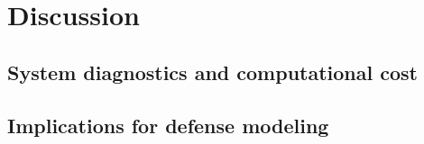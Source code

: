 
\section{Discussion}
\label{sec:discussion}

\subsection{System diagnostics and computational cost}
\label{sub:system_diagnostics_and_computational_cost}

\subsection{Implications for defense modeling}
\label{sub:implications_for_defense_modeling}
